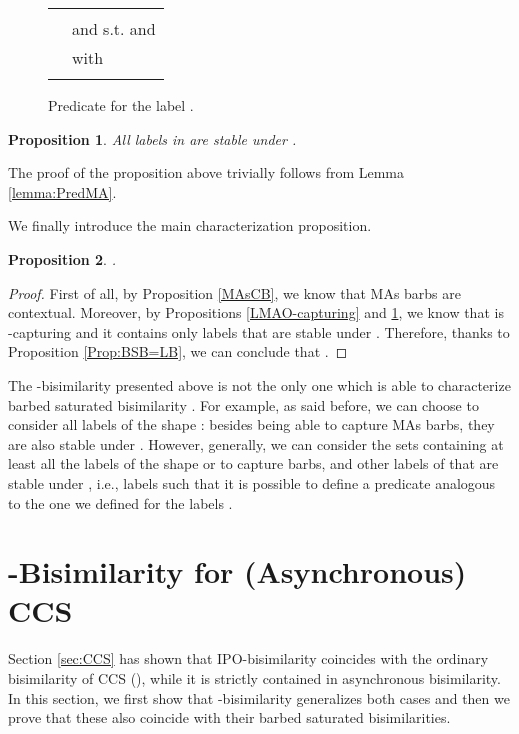 \documentclass[copyright,creativecommons]{eptcs}
\newcommand{\<}{\langle}
\renewcommand{\>}{\rangle}
\newtheorem{proposition}{Proposition}{}
\begin{document}
\begin{figure}[!t]
\begin{tabular}{p{3 cm} p{12.1 cm}}
\hline
\\
 &  and  s.t.  and  \\
& with \\ \\
\hline
\end{tabular}
\caption{Predicate for the label .}
\label{PredMA}
\end{figure}

\begin{proposition} \label{LMAStable}
All labels in  are stable under .
\end{proposition}

The proof of the proposition above trivially follows from Lemma \ref{lemma:PredMA}.



We finally introduce the main characterization proposition.

\begin{proposition}
.
\end{proposition}

\begin{proof}
  First of all, by Proposition \ref{MAsCB}, we know that MAs barbs are
  contextual.  Moreover, by Propositions \ref{LMAO-capturing} and
  \ref{LMAStable}, we know that  is
  -capturing and it contains only labels
  that are stable under .  Therefore,
  thanks to Proposition \ref{Prop:BSB=LB}, we can conclude that
  .
\end{proof}

The -bisimilarity  presented above is not the only
one which is able to characterize barbed saturated bisimilarity
. For example, as said before, we
can choose to consider all labels of the shape : besides being able to capture MAs barbs, they are
also stable under . However,
generally, we can consider the sets  containing at least all
the labels of the shape  or  to capture barbs, and other labels of 
that are stable under , i.e., labels
such that it is possible to define a predicate analogous to the one
we defined for the labels .



\section{-Bisimilarity for (Asynchronous) CCS} \label{sec:L-BisCCS}

Section \ref{sec:CCS} has shown that IPO-bisimilarity coincides with
the ordinary bisimilarity of CCS (), while it is
strictly contained in asynchronous bisimilarity. In this section, we
first show that -bisimilarity generalizes both cases and then we
prove that these also coincide with their barbed saturated
bisimilarities.
\end{document}
